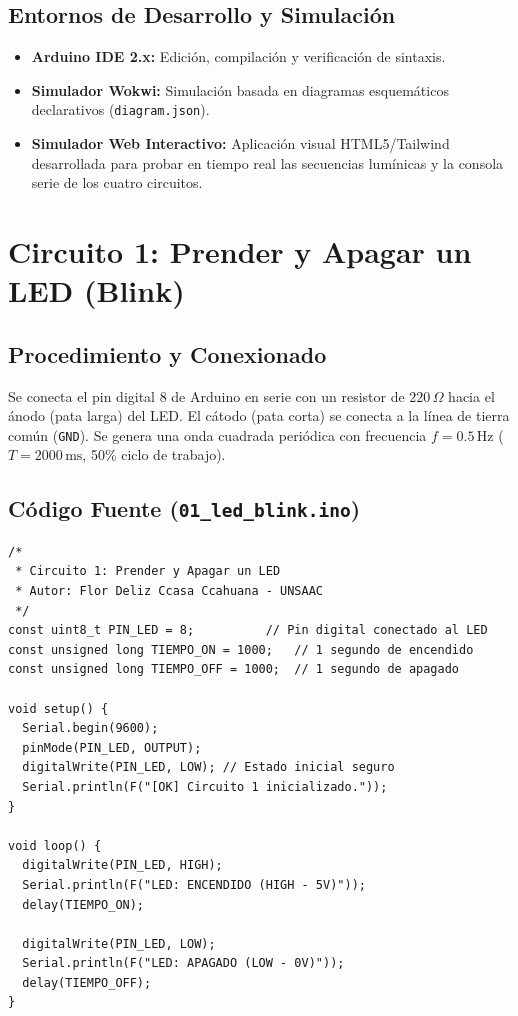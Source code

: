 \documentclass[12pt,a4paper]{article}
\begin{document}
\subsection{Entornos de Desarrollo y Simulación}
\begin{itemize}[noitemsep]
    \item \textbf{Arduino IDE 2.x:} Edición, compilación y verificación de sintaxis.
    \item \textbf{Simulador Wokwi:} Simulación basada en diagramas esquemáticos declarativos (\texttt{diagram.json}).
    \item \textbf{Simulador Web Interactivo:} Aplicación visual HTML5/Tailwind desarrollada para probar en tiempo real las secuencias lumínicas y la consola serie de los cuatro circuitos.
\end{itemize}

\section{Circuito 1: Prender y Apagar un LED (Blink)}

\subsection{Procedimiento y Conexionado}
Se conecta el pin digital 8 de Arduino en serie con un resistor de $220\,\Omega$ hacia el ánodo (pata larga) del LED. El cátodo (pata corta) se conecta a la línea de tierra común (\texttt{GND}). Se genera una onda cuadrada periódica con frecuencia $f = 0.5\,\text{Hz}$ ($T = 2000\,\text{ms}$, 50\% ciclo de trabajo).

\subsection{Código Fuente (\texttt{01\_led\_blink.ino})}
\begin{lstlisting}
/*
 * Circuito 1: Prender y Apagar un LED
 * Autor: Flor Deliz Ccasa Ccahuana - UNSAAC
 */
const uint8_t PIN_LED = 8;          // Pin digital conectado al LED
const unsigned long TIEMPO_ON = 1000;   // 1 segundo de encendido
const unsigned long TIEMPO_OFF = 1000;  // 1 segundo de apagado

void setup() {
  Serial.begin(9600);
  pinMode(PIN_LED, OUTPUT);
  digitalWrite(PIN_LED, LOW); // Estado inicial seguro
  Serial.println(F("[OK] Circuito 1 inicializado."));
}

void loop() {
  digitalWrite(PIN_LED, HIGH);
  Serial.println(F("LED: ENCENDIDO (HIGH - 5V)"));
  delay(TIEMPO_ON);

  digitalWrite(PIN_LED, LOW);
  Serial.println(F("LED: APAGADO (LOW - 0V)"));
  delay(TIEMPO_OFF);
}
\end{lstlisting}
\end{document}
